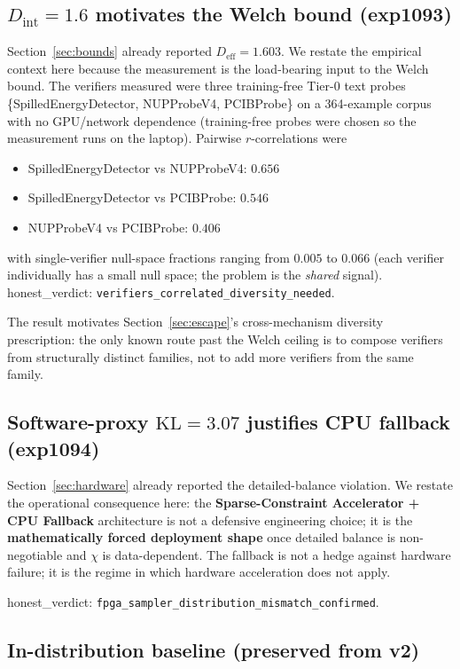 \documentclass[10pt]{article}
\begin{document}
\subsection{$D_{\mathrm{int}} = 1.6$ motivates the Welch bound (exp1093)}

Section~\ref{sec:bounds} already reported $D_{\mathrm{eff}} = 1.603$.
We restate the empirical context here because the measurement is
the load-bearing input to the Welch bound. The verifiers measured
were three training-free Tier-0 text probes
\{SpilledEnergyDetector, NUPProbeV4, PCIBProbe\} on a 364-example
corpus with no GPU/network dependence (training-free probes were
chosen so the measurement runs on the laptop). Pairwise
$r$-correlations were
\begin{itemize}
  \item SpilledEnergyDetector vs NUPProbeV4: $0.656$
  \item SpilledEnergyDetector vs PCIBProbe: $0.546$
  \item NUPProbeV4 vs PCIBProbe: $0.406$
\end{itemize}
with single-verifier null-space fractions ranging from $0.005$ to
$0.066$ (each verifier individually has a small null space; the
problem is the \emph{shared} signal). honest\_verdict:
\texttt{verifiers\_correlated\_diversity\_needed}.

The result motivates Section~\ref{sec:escape}'s cross-mechanism
diversity prescription: the only known route past the Welch ceiling
is to compose verifiers from structurally distinct families, not
to add more verifiers from the same family.

\subsection{Software-proxy $\mathrm{KL} = 3.07$ justifies CPU fallback (exp1094)}

Section~\ref{sec:hardware} already reported the detailed-balance
violation. We restate the operational consequence here: the
\textbf{Sparse-Constraint Accelerator + CPU Fallback} architecture
is not a defensive engineering choice; it is the
\textbf{mathematically forced deployment shape} once detailed
balance is non-negotiable and $\chi$ is data-dependent. The
fallback is not a hedge against hardware failure; it is the regime
in which hardware acceleration does not apply.

honest\_verdict: \texttt{fpga\_sampler\_distribution\_mismatch\_confirmed}.

\subsection{In-distribution baseline (preserved from v2)}
\label{sec:baseline}
\end{document}
